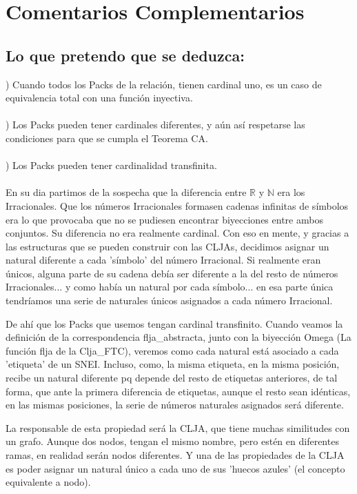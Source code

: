 \chapter[Ordenados por referencias, no por aparición]{Comentarios Complementarios}

\section {Lo que pretendo que se deduzca:}

) Cuando todos los Packs de la relación, tienen cardinal uno, es un caso de equivalencia total con una función inyectiva.\\\\
) Los Packs pueden tener cardinales diferentes, y aún así respetarse las condiciones para que se cumpla el Teorema CA.\\\\
) Los Packs pueden tener cardinalidad transfinita.\\\\

En su dia partimos de la sospecha que la diferencia entre $\mathbb{R}$ y $\mathbb{N}$ era los Irracionales. Que los números Irracionales formasen cadenas infinitas de símbolos era lo que provocaba que no se pudiesen encontrar biyecciones entre ambos conjuntos. Su diferencia no era realmente cardinal. Con eso en mente, y gracias a las estructuras que se pueden construir con las CLJAs, decidimos asignar un natural diferente a cada 'símbolo' del número Irracional. Si realmente eran únicos, alguna parte de su cadena debía ser diferente a la del resto de números Irracionales... y como había un natural por cada símbolo... en esa parte única tendríamos una serie de naturales únicos asignados a cada número Irracional.

De ahí que los Packs que usemos tengan cardinal transfinito. Cuando veamos la definición de la correspondencia flja\_abstracta, junto con la biyección Omega (La función flja de la Clja\_FTC), veremos como cada natural está asociado a cada 'etiqueta' de un SNEI. Incluso, como, la misma etiqueta, en la misma posición, recibe un natural diferente pq depende del resto de etiquetas anteriores, de tal forma, que ante la primera diferencia de etiquetas, aunque el resto sean idénticas, en las mismas posiciones, la serie de números naturales asignados será diferente.

La responsable de esta propiedad será la CLJA, que tiene muchas similitudes con un grafo. Aunque dos nodos, tengan el mismo nombre, pero estén en diferentes ramas, en realidad serán nodos diferentes. Y una de las propiedades de la CLJA es poder asignar un natural único a cada uno de sus 'huecos azules' (el concepto equivalente a nodo).


